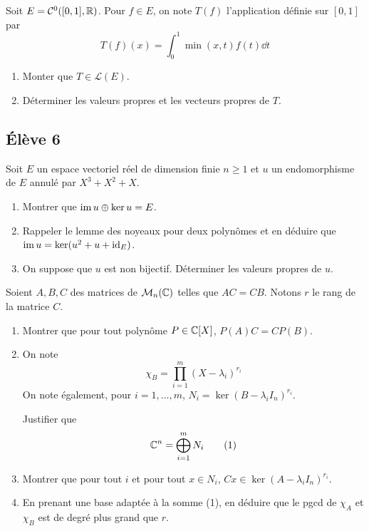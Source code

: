 \documentclass[10pt]{scrartcl}
\begin{document}
    \begin{exo}
        Soit $E=\mathcal C^0([0,1],\operatorname{\mathbb R})$.
        Pour $f\in E$, on note $T(f)$ l'application définie sur $[0,1]$ par 
        \[
            T(f)(x)=\int_0^1\min(x,t)f(t)\dd t 
        \]
        \begin{enumerate}
            \item Monter que $T\in\mathcal L(E)$.
            \item Déterminer les valeurs propres et les vecteurs propres de $T$.
        \end{enumerate}
    \end{exo}

    \subsection*{Élève 6}
    \begin{ccp}
        Soit $E$ un espace vectoriel réel de dimension finie $n\geq 1$ 
        et $u$ un endomorphisme de $E$ annulé par $X^3+X^2+X$. 
        \begin{enumerate}
            \item Montrer que $\operatorname{im} u\oplus\operatorname{ker} u = E$.
            \item Rappeler le lemme des noyeaux pour deux polynômes et en déduire que 
            $\operatorname{im} u = \operatorname{ker}(u^2+u+\operatorname{id}_E)$.
            \item On suppose que $u$ est non bijectif. 
            Déterminer les valeurs propres de $u$.
        \end{enumerate}
    \end{ccp}

    \begin{exo}
        Soient $A,B,C$ des matrices de $\mathcal M_n(\operatorname{\mathbb C})$ telles que $AC=CB$. 
        Notons $r$ le rang de la matrice $C$. 
        \begin{enumerate}
            \item Montrer que pour tout polynôme $P\in\operatorname{\mathbb C}[X]$, $P(A)C=CP(B)$.
            \item On note 
            \[
                \chi_B=\prod_{i=1}^m(X-\lambda_i)^{r_i}
            \]
            On note également, pour $i=1,\dots,m$, $N_i=\ker(B-\lambda_i I_n)^{r_i}$. 

            Justifier que 
            \[
                \operatorname{\mathbb C}^n=\bigoplus_{i=1}^mN_i\tag*{(1)}
            \]
            \item Montrer que pour tout $i$ et pour tout $x\in N_i$, $Cx\in\ker(A-\lambda_i I_n)^{r_i}$.
            \item En prenant une base adaptée à la somme (1), en déduire que le pgcd de $\chi_A$ et $\chi_B$ est de degré plus grand que $r$.
        \end{enumerate}
    \end{exo}
\end{document}
